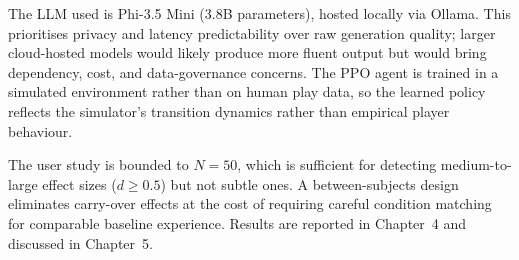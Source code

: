 The LLM used is Phi-3.5 Mini (3.8B parameters), hosted locally via Ollama. This prioritises privacy and latency predictability over raw generation quality; larger cloud-hosted models would likely produce more fluent output but would bring dependency, cost, and data-governance concerns. The PPO agent is trained in a simulated environment rather than on human play data, so the learned policy reflects the simulator's transition dynamics rather than empirical player behaviour.

The user study is bounded to $N = 50$, which is sufficient for detecting medium-to-large effect sizes ($d \geq 0.5$) but not subtle ones. A between-subjects design eliminates carry-over effects at the cost of requiring careful condition matching for comparable baseline experience. Results are reported in Chapter~4 and discussed in Chapter~5.
